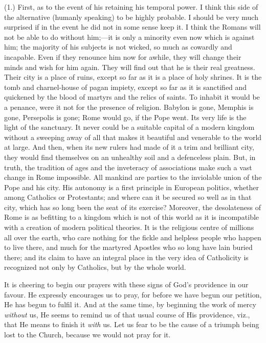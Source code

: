 (1.) First, as to the event of his retaining his
temporal power. I think this side of the alternative
(humanly speaking) to be highly probable. I should be
very much surprised if in the event he did not in some
sense keep it. I think the Romans will not be able to do
without him;—it is only a minority even now which is
against him; the majority of his subjects is not wicked,
so much as cowardly and incapable. Even if they renounce
him now for awhile, they will change their minds and wish
for him again. They will find out that he is their real
greatness. Their city is a place of ruins, except so far
as it is a place of holy shrines. It is the tomb and
charnel-house of pagan impiety, except so far as it is
sanctified and quickened by the blood of martyrs and the
relics of saints. To inhabit it would be a penance, were
it not for the presence of religion. Babylon is gone,
Memphis is gone, Persepolis is gone; Rome would go, if
the Pope went. Its very life is the light of the
sanctuary. It never could be a suitable capital of a
modern kingdom without a sweeping away of all that makes
it beautiful and venerable to the world at large. And
then, when its new rulers had made of it a trim and
brilliant city, they would find themselves on an
unhealthy soil and a defenceless plain. But, in truth,
the tradition of ages and the inveteracy of associations
make such a vast change in Rome impossible. All mankind
are parties to the inviolable union of the Pope and his
city. His autonomy is a first principle in European
politics, whether among Catholics or Protestants; and
where can it be secured so well as in that city, which
has so long been the seat of its exercise? Moreover, the
desolateness of Rome is as befitting to a kingdom which
is not of this world as it is incompatible with a
creation of modern political theories. It is the
religious centre of millions all over the earth, who care
nothing for the fickle and helpless people who happen to
live there, and much for the martyred Apostles who so
long have lain buried there; and its claim to have an
integral place in the very idea of Catholicity is
recognized not only by Catholics, but by the whole world.

It is cheering to begin our prayers with these signs
of God's providence in our favour. He expressly
encourages us to pray, for before we have begun our
petition, He has begun to fulfil it. And at the same
time, by beginning the work of mercy \emph{without} us,
He seems to remind us of that usual course of His
providence, viz., that He means to finish it \emph{with}
us. Let us fear to be the cause of a triumph being lost
to the Church, because we would not pray for it.

